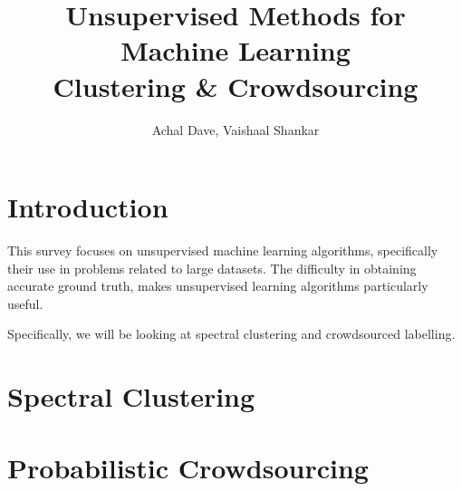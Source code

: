 \documentclass{article}
\title{Unsupervised Methods for Machine Learning \\
\large Clustering \& Crowdsourcing}
\author{Achal Dave, Vaishaal Shankar}
\date{}
\begin{document}
\maketitle
\tableofcontents
\clearpage


\section{Introduction}

This survey focuses on unsupervised machine learning algorithms,
specifically their use in problems related to large datasets.
The difficulty in obtaining accurate ground truth, makes unsupervised
learning algorithms particularly useful.

Specifically, we will be looking at spectral clustering and crowdsourced labelling.
\section{Spectral Clustering}


\newpage

\section{Probabilistic Crowdsourcing}




\end{document}
